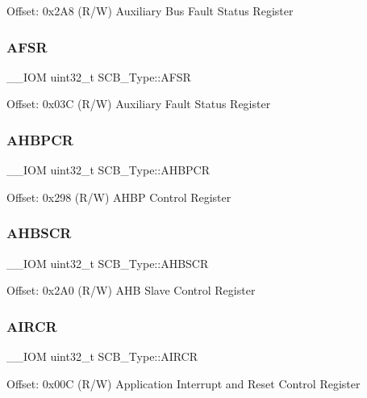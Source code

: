 Offset\+: 0x2\+A8 (R/W) Auxiliary Bus Fault Status Register \mbox{\label{structSCB__Type_ab65372404ce64b0f0b35e2709429404e}} 
\subsubsection{\texorpdfstring{AFSR}{AFSR}}
{\footnotesize\ttfamily \+\_\+\+\_\+\+I\+OM uint32\+\_\+t S\+C\+B\+\_\+\+Type\+::\+A\+F\+SR}

Offset\+: 0x03C (R/W) Auxiliary Fault Status Register \mbox{\label{structSCB__Type_a0d53bcea294422b5b4ecfdcd9cdc1773}} 
\subsubsection{\texorpdfstring{AHBPCR}{AHBPCR}}
{\footnotesize\ttfamily \+\_\+\+\_\+\+I\+OM uint32\+\_\+t S\+C\+B\+\_\+\+Type\+::\+A\+H\+B\+P\+CR}

Offset\+: 0x298 (R/W) A\+H\+BP Control Register \mbox{\label{structSCB__Type_a8c9d9eac30594dd061d34cfaacd5e4bb}} 
\subsubsection{\texorpdfstring{AHBSCR}{AHBSCR}}
{\footnotesize\ttfamily \+\_\+\+\_\+\+I\+OM uint32\+\_\+t S\+C\+B\+\_\+\+Type\+::\+A\+H\+B\+S\+CR}

Offset\+: 0x2\+A0 (R/W) A\+HB Slave Control Register \mbox{\label{structSCB__Type_ad3e5b8934c647eb1b7383c1894f01380}} 
\subsubsection{\texorpdfstring{AIRCR}{AIRCR}}
{\footnotesize\ttfamily \+\_\+\+\_\+\+I\+OM uint32\+\_\+t S\+C\+B\+\_\+\+Type\+::\+A\+I\+R\+CR}

Offset\+: 0x00C (R/W) Application Interrupt and Reset Control Register \mbox{\label{structSCB__Type_a3f8e7e58be4e41c88dfa78f54589271c}} 
